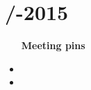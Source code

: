 \section{\logtitle /-2015}
\attend{\at}{\at}{\at}{\at}


\begin{itemize}
	\item [\textbf{Meeting pins}]
	\item
	\item 
\end{itemize}